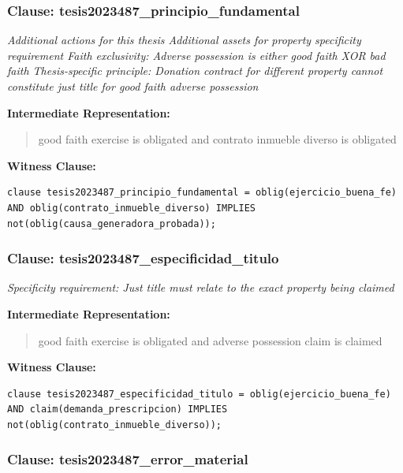 \documentclass[11pt,a4paper]{article}
\begin{document}
\subsubsection{Clause: tesis2023487\_principio\_fundamental}

\textit{Additional actions for this thesis Additional assets for property specificity requirement Faith exclusivity: Adverse possession is either good faith XOR bad faith Thesis-specific principle: Donation contract for different property cannot constitute just title for good faith adverse possession}

\textbf{Intermediate Representation:}

\begin{quote}
good faith exercise is obligated and contrato inmueble diverso is obligated
\end{quote}

\textbf{Witness Clause:}

\begin{lstlisting}[style=witnessstyle, language=Witness]
clause tesis2023487_principio_fundamental = oblig(ejercicio_buena_fe) AND oblig(contrato_inmueble_diverso) IMPLIES not(oblig(causa_generadora_probada));
\end{lstlisting}

\subsubsection{Clause: tesis2023487\_especificidad\_titulo}

\textit{Specificity requirement: Just title must relate to the exact property being claimed}

\textbf{Intermediate Representation:}

\begin{quote}
good faith exercise is obligated and adverse possession claim is claimed
\end{quote}

\textbf{Witness Clause:}

\begin{lstlisting}[style=witnessstyle, language=Witness]
clause tesis2023487_especificidad_titulo = oblig(ejercicio_buena_fe) AND claim(demanda_prescripcion) IMPLIES not(oblig(contrato_inmueble_diverso));
\end{lstlisting}

\subsubsection{Clause: tesis2023487\_error\_material}
\end{document}
